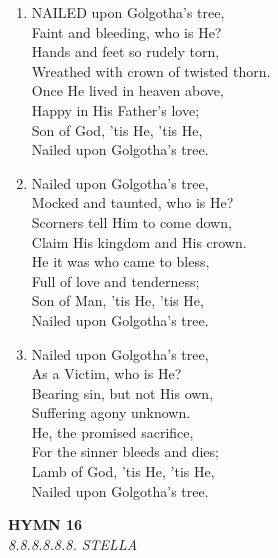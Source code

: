 \begin{enumerate}
    \item NAILED upon Golgotha's tree, \\
        Faint and bleeding, who is He? \\
        Hands and feet so rudely torn, \\
        Wreathed with crown of twisted thorn. \\
        Once He lived in heaven above, \\
        Happy in His Father's love; \\
        Son of God, 'tis He, 'tis He, \\
        Nailed upon Golgotha's tree.

    \item Nailed upon Golgotha's tree, \\
        Mocked and taunted, who is He? \\
        Scorners tell Him to come down, \\
        Claim His kingdom and His crown. \\
        He it was who came to bless, \\
        Full of love and tenderness; \\
        Son of Man, 'tis He, 'tis He, \\
        Nailed upon Golgotha's tree.

    \item Nailed upon Golgotha's tree, \\
        As a Victim, who is He? \\
        Bearing sin, but not His own, \\
        Suffering agony unknown. \\
        He, the promised sacrifice, \\
        For the sinner bleeds and dies; \\
        Lamb of God, 'tis He, 'tis He, \\
        Nailed upon Golgotha's tree.

\end{enumerate}

\newpage
\begin{center}
    {\Large \textbf{HYMN 16}}
    \\
    \textit{8.8.8.8.8.8. STELLA}
\end{center}
\vspace{1em}

